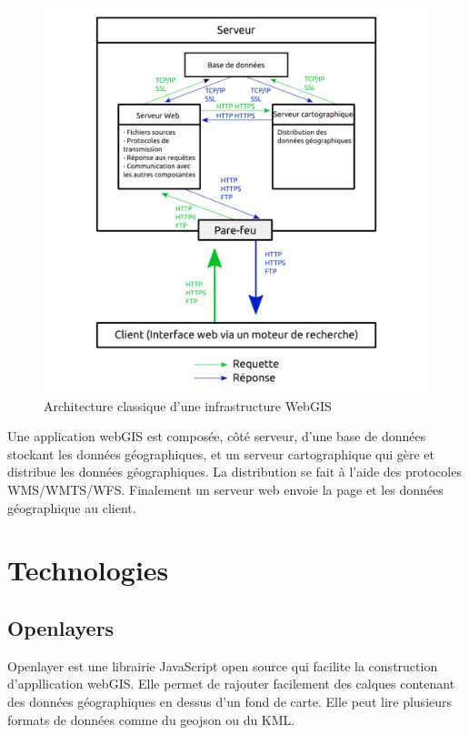 \documentclass[
    iai, %
    il, %
]{heig-tb}
\begin{document}
\begin{figure}[H]
    \caption{Architecture classique d'une infrastructure WebGIS}
    \centering
    \includegraphics[scale=0.3]{webGIS_archi.png}
\end{figure}

Une application webGIS \cite{architecture-webgis} est composée, côté serveur, d'une base de données stockant les données géographiques, et un serveur cartographique qui gère et distribue les données géographiques.
La distribution se fait à l'aide des protocoles WMS/WMTS/WFS.
Finalement un serveur web envoie la page et les données géographique au client.

\section{Technologies }

\subsection{Openlayers}
Openlayer \cite{openlayers} est une librairie JavaScript open source qui facilite la construction d'appllication webGIS.
Elle permet de rajouter facilement des calques contenant des données géographiques en dessus d'un fond de carte.
Elle peut lire plusieurs formats de données comme du geojson ou du KML.
\end{document}
